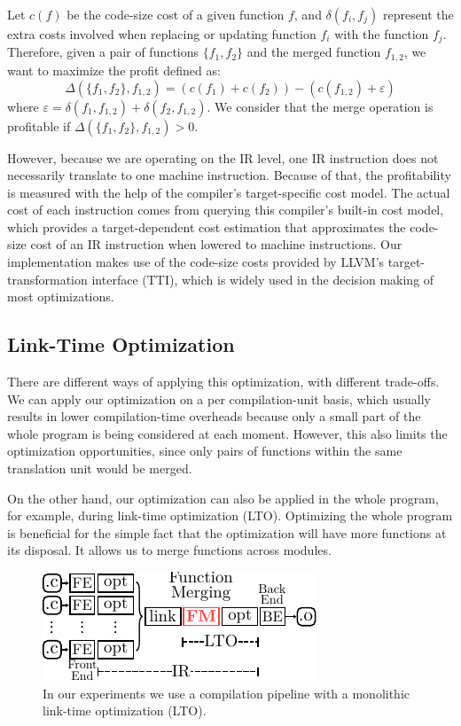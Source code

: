 Let $c(f)$ be the code-size cost of a given function $f$, and
$\delta(f_i, f_j)$ represent the extra costs involved when replacing or
updating function $f_i$ with the function $f_j$.
Therefore, given a pair of functions $\{f_1,f_2\}$ and the merged function
$f_{1,2}$, we want to maximize the profit defined as:
\[
  \Delta(\{f_1,f_2\},f_{1,2}) = (c(f_1)+c(f_2)) - (c(f_{1,2}) + \varepsilon)
\]
where $\varepsilon = \delta(f_1, f_{1,2}) + \delta(f_2, f_{1,2})$.
We consider that the merge operation is profitable if $\Delta(\{f_1,f_2\},f_{1,2})>0$.

However, because we are operating on the IR level, one IR instruction does not
necessarily translate to one machine instruction.
Because of that, the profitability is measured with the help of the compiler's
target-specific cost model.
The actual cost of each instruction comes from querying this compiler's built-in
cost model, which provides a target-dependent cost estimation that approximates
the code-size cost of an IR instruction when lowered to machine instructions.
Our implementation makes use of the code-size costs provided by LLVM's
target-transformation interface (TTI), which is widely used in the decision
making of most optimizations.

\subsection{Link-Time Optimization}

There are different ways of applying this optimization, with different trade-offs.
We can apply our optimization on a per compilation-unit basis, which usually
results in lower compilation-time overheads because only a small part of the
whole program is being considered at each moment.
However, this also limits the optimization opportunities, since only pairs of
functions within the same translation unit would be merged.

On the other hand, our optimization can also be applied in the whole program,
for example, during link-time optimization (LTO).
Optimizing the whole program is beneficial for the simple fact that the
optimization will have more functions at its disposal.
It allows us to merge functions across modules.

\begin{figure}[h]
  \centering
  \includegraphics[width=0.7\linewidth]{figs/opt-pipeline.pdf}
  \caption{In our experiments we use a compilation pipeline with a monolithic link-time optimization (LTO).}
  \label{fig:opt-pipeline}
\end{figure}


